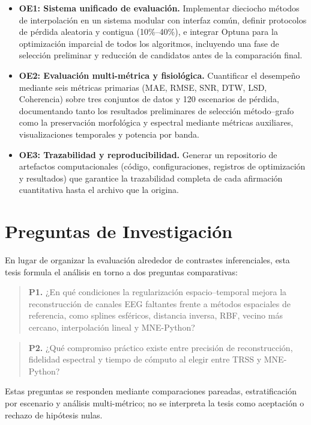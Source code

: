\begin{itemize}
  \item \textbf{OE1: Sistema unificado de evaluación.} Implementar dieciocho métodos de interpolación en un sistema modular con interfaz común, definir protocolos de pérdida aleatoria y contigua (10\%--40\%), e integrar Optuna para la optimización imparcial de todos los algoritmos, incluyendo una fase de selección preliminar y reducción de candidatos antes de la comparación final.

  \item \textbf{OE2: Evaluación multi-métrica y fisiológica.} Cuantificar el desempeño mediante seis métricas primarias (MAE, RMSE, SNR, DTW, LSD, Coherencia) sobre tres conjuntos de datos y 120 escenarios de pérdida, documentando tanto los resultados preliminares de selección método--grafo como la preservación morfológica y espectral mediante métricas auxiliares, visualizaciones temporales y potencia por banda.

  \item \textbf{OE3: Trazabilidad y reproducibilidad.} Generar un repositorio de artefactos computacionales (código, configuraciones, registros de optimización y resultados) que garantice la trazabilidad completa de cada afirmación cuantitativa hasta el archivo que la origina.
\end{itemize}

\section{Preguntas de Investigación}

En lugar de organizar la evaluación alrededor de contrastes inferenciales, esta tesis formula el análisis en torno a dos preguntas comparativas:

\begin{quote}
\textbf{P1.} ¿En qué condiciones la regularización espacio--temporal mejora la reconstrucción de canales EEG faltantes frente a métodos espaciales de referencia, como splines esféricos, distancia inversa, RBF, vecino más cercano, interpolación lineal y MNE-Python?
\end{quote}

\begin{quote}
\textbf{P2.} ¿Qué compromiso práctico existe entre precisión de reconstrucción, fidelidad espectral y tiempo de cómputo al elegir entre TRSS y MNE-Python?
\end{quote}

Estas preguntas se responden mediante comparaciones pareadas, estratificación por escenario y análisis multi-métrico; no se interpreta la tesis como aceptación o rechazo de hipótesis nulas.
